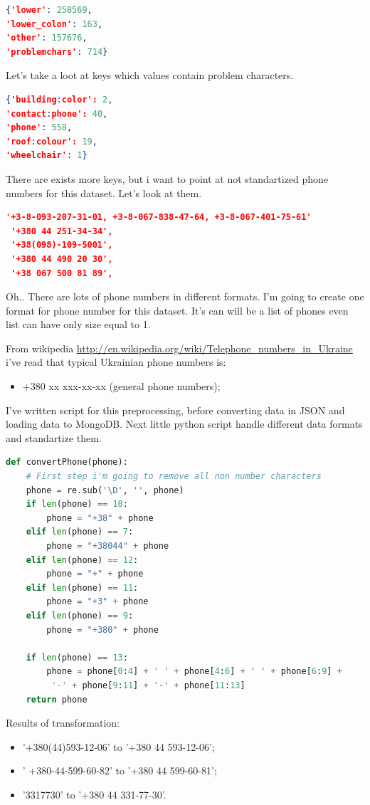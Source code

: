 \documentclass[a4paper,12pt,twoside]{article}
\begin{document}
\begin{lstlisting}[language=json,firstnumber=1]
{'lower': 258569,
'lower_colon': 163,
'other': 157676,
'problemchars': 714}
\end{lstlisting}
Let's take a loot at keys which values contain problem characters.
\begin{lstlisting}[language=json,firstnumber=1]
{'building:color': 2,
'contact:phone': 40,
'phone': 558,
'roof:colour': 19,
'wheelchair': 1}
\end{lstlisting}
There are exists more keys, but i want to point at not standartized phone numbers for this dataset. Let's look at them.
\begin{lstlisting}[language=json, firstnumber=1]
'+3-8-093-207-31-01, +3-8-067-838-47-64, +3-8-067-401-75-61'
 '+380 44 251-34-34',
 '+38(098)-109-5001',
 '+380 44 490 20 30',
 '+38 067 500 81 89',
\end{lstlisting}
Oh.. There are lots of phone numbers in different formats. I'm going to create one format for phone number for this dataset. It's can will be a list of phones even list can have only size equal to 1.\par
From wikipedia \url{http://en.wikipedia.org/wiki/Telephone_numbers_in_Ukraine} i've read that typical Ukrainian phone numbers is:
\begin{itemize}
\item +380 xx xxx-xx-xx (general phone numbers);
\end{itemize}
I've written script for this preprocessing, before converting data in JSON and loading data to MongoDB. Next little python script handle different data formats and standartize them.
\begin{lstlisting}[language=python, firstnumber=1]
def convertPhone(phone):
    # First step i'm going to remove all non number characters
    phone = re.sub('\D', '', phone)
    if len(phone) == 10:
        phone = "+38" + phone
    elif len(phone) == 7:
        phone = "+38044" + phone
    elif len(phone) == 12:
        phone = "+" + phone
    elif len(phone) == 11:
        phone = "+3" + phone
    elif len(phone) == 9:
        phone = "+380" + phone

    if len(phone) == 13:
        phone = phone[0:4] + ' ' + phone[4:6] + ' ' + phone[6:9] +
         '-' + phone[9:11] + '-' + phone[11:13]
    return phone
\end{lstlisting} 
Results of transformation:
\begin{itemize}
\item '+380(44)593-12-06' to '+380 44 593-12-06';
\item ' +380-44-599-60-82' to '+380 44 599-60-81';
\item '3317730' to '+380 44 331-77-30'.
\end{itemize}
\end{document}
